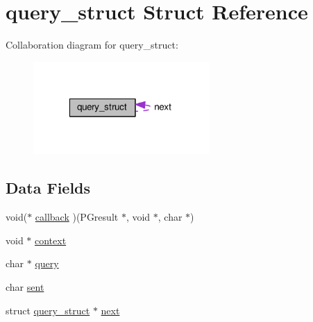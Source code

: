 \hypertarget{structquery__struct}{\section{query\-\_\-struct Struct Reference}
\label{structquery__struct}
}


Collaboration diagram for query\-\_\-struct\-:
\nopagebreak
\begin{figure}[H]
\begin{center}
\leavevmode
\includegraphics[width=190pt]{structquery__struct__coll__graph}
\end{center}
\end{figure}
\subsection*{Data Fields}
\begin{DoxyCompactItemize}
\item 
void($\ast$ \hyperlink{structquery__struct_a9e358202526ef6f362060add447a5822}{callback} )(P\-Gresult $\ast$, void $\ast$, char $\ast$)
\item 
void $\ast$ \hyperlink{structquery__struct_ae376f130b17d169ee51be68077a89ed0}{context}
\item 
char $\ast$ \hyperlink{structquery__struct_af26982218484ec3fdcb8f7d92e864a9b}{query}
\item 
char \hyperlink{structquery__struct_a59a9dc1eb9f9942b0a09df5acb7a31ff}{sent}
\item 
struct \hyperlink{structquery__struct}{query\-\_\-struct} $\ast$ \hyperlink{structquery__struct_addbda803c3d54ffae5a8c673ea3e701e}{next}
\end{DoxyCompactItemize}


